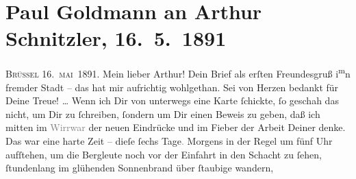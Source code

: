 

         
         \renewcommand{\erwaehntePersonen}{Personen: Richard Beer-Hofmann, Hugo von Hofmannsthal, Jaques Joachim, Julius Kulka, Felix Salten, Falk Schupp, Gustav Schwarzkopf, Boris Van-Jung, Leo Van-Jung, Olga Waissnix}
         \renewcommand{\erwaehnteInstitutionen}{Institutionen: Houghton Library, Jung Wien}
         \renewcommand{\erwaehnteOrte}{Orte: Bad Ischl, Baden bei Wien, Belgien, Brüssel, Halle an der Saale, Joseph G. Wieninger, Weinhandlung, Wien}
         \renewcommand{\erwaehnteWerke}{Werke: Das Märchen. Schauspiel in drei Aufzügen, Frankfurter Zeitung, Tagebuch}
               \section[Paul Goldmann an Arthur Schnitzler, 16. 5. 1891]{ Paul Goldmann an Arthur Schnitzler, 16. 5. 1891}\nopagebreak{}\rehead{ }\begin{ledgroupsized}[t]{13cm}\normalsize\beginnumbering \toendnotes[C]{\smallbreak\pagebreak[2]} 
\toendnotes[C]{\smallbreak}\pstart
           \centering{}{\pb}\textsc{Brüssel}{ }16. \textsc{mai} 1891.\pend
           \pstart\center{}Mein lieber Arthur!\pend\pstart
           Dein Brief als erſten Freundesgruß i\substVorne{}\textsuperscript{m}\substDazwischen{}n\substHinten{} fremder Stadt – das
               hat mir aufrichtig wohlgethan. Sei von Herzen bedankt für Deine Treue! {\dots} Wenn ich Dir von unterwegs eine Karte ſchickte, ſo
               geschah das nicht, um Dir zu ſchreiben, ſondern um Dir einen Beweis zu geben, daß ich
               mitten im \textcolor{gray}{Wirrwar} der neuen Eindrücke und im Fieber der Arbeit
               Deiner denke. Das war eine harte Zeit – dieſe ſechs Tage\textcolor{gray}{.} Morgens
               in der Regel um fünf Uhr aufſtehen, um die Bergleute noch vor der Einfahrt in den
               Schacht zu ſehen, ſtundenlang im glühenden Sonnenbrand über ſtaubige \label{K_L02663-5v}\label{K_L02663-5h} wandern,

\end{ledgroupsized}
